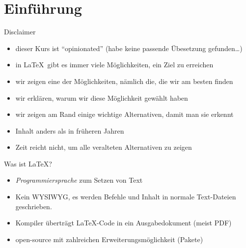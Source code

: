 \section{Einführung}

\begin{frame}{Disclaimer}
  \begin{itemize}
    \item dieser Kurs ist \enquote{opinionated} (habe keine passende Übesetzung gefunden…)
    \item in \LaTeX\ gibt es immer viele Möglichkeiten, ein Ziel zu erreichen
    \item wir zeigen eine der Möglichkeiten, nämlich die, die wir am besten finden
    \item wir erklären, warum wir diese Möglichkeit gewählt haben
    \item wir zeigen am Rand einige wichtige Alternativen, damit man sie erkennt
  \end{itemize}

  \vspace{10pt}
  \begin{itemize}
    \item Inhalt anders als in früheren Jahren
    \item Zeit reicht nicht, um alle veralteten Alternativen zu zeigen
  \end{itemize}
\end{frame}

\begin{frame}{Was ist \LaTeX?}
  \begin{itemize}
    \item \emph{Programmiersprache} zum Setzen von Text
    \item Kein WYSIWYG, es werden Befehle und Inhalt in normale Text-Dateien geschrieben.
    \item Kompiler überträgt \LaTeX-Code in ein Ausgabedokument (meist PDF)
    \item open-source mit zahlreichen Erweiterungsmöglichkeit (Pakete)
  \end{itemize}
\end{frame}

